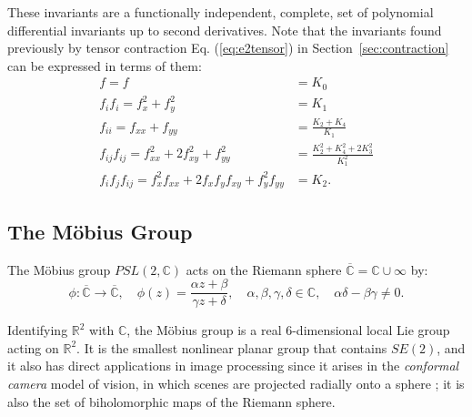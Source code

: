 \documentclass{artjlt}
\def\R{\mathbb{R}}
\begin{document}
These invariants are a functionally independent, complete, set of
polynomial differential invariants up to second derivatives. Note that the
invariants found previously by tensor contraction Eq. (\ref{eq:e2tensor}) in
Section~\ref{sec:contraction} can be expressed in terms of them:
\begin{align*}
  f = f &= K_0 \\
  f_if_i = f_x^2 + f_y^2 &= K_1 \\
  f_{ii} = f_{xx} + f_{yy} &= \frac{K_2 + K_4}{K_1} \\
  f_{ij} f_{ij} = f_{xx}^2 + 2f_{xy}^2 + f_{yy}^2 &= \frac{K_2^2 + K_4^2 + 2K_3^2}{K_1^2} \\
  f_i f_j f_{ij} = f_x^2 f_{xx} + 2f_x f_y f_{xy} + f_y^2 f_{yy} &= K_2.
\end{align*}

\subsection{The M\"{o}bius Group}

The M\"obius group $PSL(2,\mathbb{C})$ acts on the Riemann sphere $\overline{\mathbb{C}} = \mathbb{C}\cup\infty$ by:
\begin{equation} 
\phi\colon \overline{\mathbb{C}} \to \overline{\mathbb{C}},\quad \phi(z) = \frac{\alpha z + \beta}{\gamma z + \delta},\quad \alpha,\beta,\gamma,\delta\in\mathbb{C}, \quad
\alpha\delta-\beta\gamma\ne 0.
\end{equation}

Identifying $\R^2$ with $\mathbb{C}$, the M\"obius group is a real 6-dimensional local Lie group acting on $\mathbb{R}^2$. 
It is the smallest nonlinear planar group that contains $SE(2)$, and it also has direct applications in image processing since it arises in the {\em conformal camera} model of vision, in which scenes are projected radially onto a sphere \citep{Lenz1990,Turski2004}; it is also the set of biholomorphic maps of the Riemann sphere. 
\end{document}
